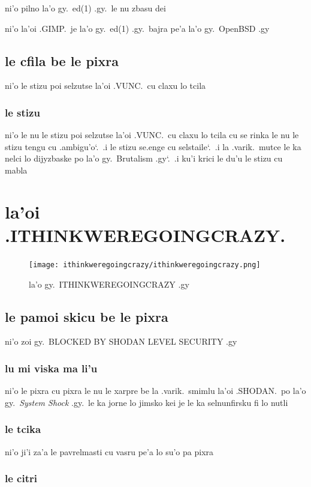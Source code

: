 \documentclass{report}
\newcommand\sds{\spacefactor\sfcode`.\ \space}
\begin{document}
ni'o pilno la'o gy.\ ed(1) .gy.\ le nu zbasu dei

ni'o la'oi .GIMP.\ je la'o gy.\ ed(1) .gy.\ bajra pe'a la'o gy.\ OpenBSD .gy

\section{le cfila be le pixra}
ni'o le stizu poi selzutse la'oi .VUNC.\ cu claxu lo tcila

\subsection{le stizu}
ni'o le nu le stizu poi selzutse la'oi .VUNC.\ cu claxu lo tcila cu se rinka le nu le stizu tengu cu .ambigu'o\sds  .i le stizu se.enge cu selstaile\sds  .i la .varik.\ mutce le ka nelci lo dijyzbaske po la'o gy.\ Brutalism .gy\sds  .i ku'i krici le du'u le stizu cu mabla

\chapter{la'oi .ITHINKWEREGOINGCRAZY.}
\begin{figure}[ht]
	\centering
	\texttt{[image: ithinkweregoingcrazy/ithinkweregoingcrazy.png]}
	\caption[center]{la'o gy.\ ITHINKWEREGOINGCRAZY .gy}
\end{figure}
\section{le pamoi skicu be le pixra}
ni'o zoi gy.\ BLOCKED BY SHODAN LEVEL SECURITY .gy

\subsection{lu mi viska ma li'u}
ni'o le pixra cu pixra le nu le xarpre be la .varik.\ smimlu la'oi .SHODAN.\ po la'o gy.\ \textit{System Shock} .gy.\ le ka jorne lo jimsko kei je le ka selnunfirsku fi lo nutli

\subsection{le tcika}
ni'o ji'i za'a le pavrelmasti cu vasru pe'a lo su'o pa pixra

\subsection{le citri}
\end{document}
